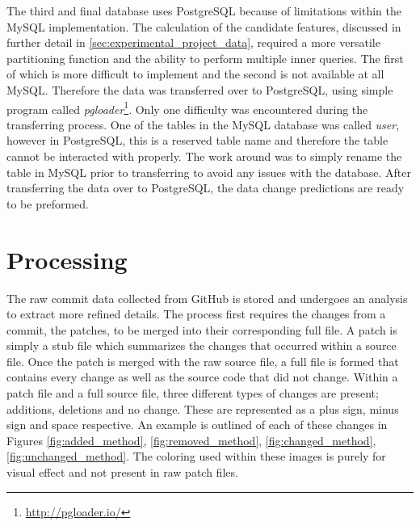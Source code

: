The third and final database uses PostgreSQL because of limitations within the MySQL implementation. The calculation of the candidate features, discussed in further detail in \autoref{sec:experimental_project_data}, required a more versatile partitioning function and the ability to perform multiple inner queries. The first of which is more difficult to implement and the second is not available at all MySQL. Therefore the data was transferred over to PostgreSQL, using simple program called \textit{pgloader}\footnote{\url{http://pgloader.io/}}. Only one difficulty was encountered during the transferring process. One of the tables in the MySQL database was called \textit{user}, however in PostgreSQL, this is a reserved table name and therefore the table cannot be interacted with properly. The work around was to simply rename the table in MySQL prior to transferring to avoid any issues with the database. After transferring the data over to PostgreSQL, the data change predictions are ready to be preformed.

\section{Processing}
\label{sec:proccessing}

The raw commit data collected from GitHub is stored and undergoes an analysis to extract more refined details. The process first requires the changes from a commit, the patches, to be merged into their corresponding full file. A patch is simply a stub file which summarizes the changes that occurred within a source file. Once the patch is merged with the raw source file, a full file is formed that contains every change as well as the source code that did not change. Within a patch file and a full source file, three different types of changes are present; additions, deletions and no change. These are represented as a plus sign, minus sign and space respective. An example is outlined of each of these changes in Figures \ref{fig:added_method}, \ref{fig:removed_method}, \ref{fig:changed_method}, \ref{fig:unchanged_method}. The coloring used within these images is purely for visual effect and not present in raw patch files.

